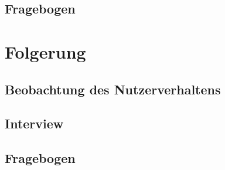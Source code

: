 \subsection{Fragebogen}

\section{Folgerung}

\subsection{Beobachtung des Nutzerverhaltens}

\subsection{Interview}

\subsection{Fragebogen}